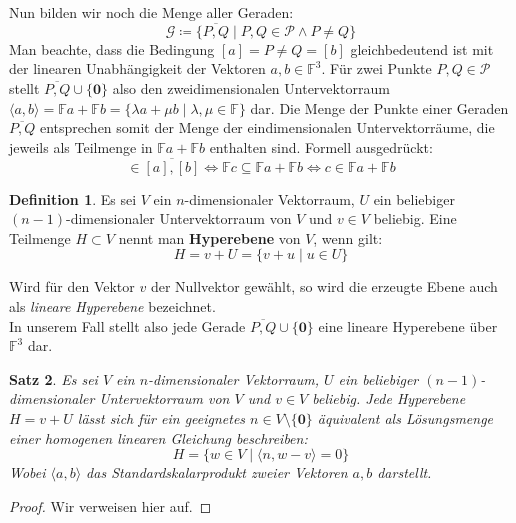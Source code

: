 \documentclass[hidelinks]{article}
\theoremstyle{plain}
\newtheorem{thm}{Satz}[section]
\theoremstyle{definition}
\newtheorem{defn}[thm]{Definition}
\theoremstyle{rem}
\begin{document}
\begin{sloppypar}
Nun bilden wir noch die Menge aller Geraden:
\begin{equation*}
	\mathcal{G}\coloneqq\{\overline{P,Q}\mid P,Q\in\mathcal{P}\land P\ne Q\}
\end{equation*}
Man beachte, dass die Bedingung $[a]=P\ne Q=[b]$ gleichbedeutend ist mit der linearen Unabhängigkeit der Vektoren $a,b\in\mathbb{F}^3$. Für zwei Punkte $P,Q\in\mathcal{P}$ stellt $\overline{P,Q}\cup\{\boldsymbol 0\}$ also den zweidimensionalen Untervektorraum $\langle a,b\rangle=\mathbb{F}a+\mathbb{F}b=\{\lambda a+\mu b\mid \lambda,\mu\in\mathbb{F}\}$ dar. 
Die Menge der Punkte einer Geraden $\overline{P,Q}$ entsprechen somit der Menge der eindimensionalen Untervektorräume, die jeweils als Teilmenge in $\mathbb{F}a+\mathbb{F}b$ enthalten sind. Formell ausgedrückt:
\begin{equation*}
	[c]\in\overline{[a],[b]}\Leftrightarrow \mathbb{F}c\subseteq\mathbb{F}a+\mathbb{F}b\Leftrightarrow c\in\mathbb{F}a+\mathbb{F}b
\end{equation*}
\begin{defn}
	Es sei $V$ ein $n$-dimensionaler Vektorraum, $U$ ein beliebiger \mbox{$(n-1)$-dimensionaler} Untervektorraum von $V$ und $v\in V$ beliebig. Eine Teilmenge $H\subset V$ nennt man \textbf{Hyperebene} von $V$, wenn gilt:
\begin{equation*}
	H=v+U=\{v+u\mid u\in U\} 
\end{equation*}
\end{defn}
Wird für den Vektor $v$ der Nullvektor gewählt, so wird die erzeugte Ebene auch als \textit{lineare Hyperebene} bezeichnet.\\
In unserem Fall stellt also jede Gerade $\overline{P,Q}\cup\{\boldsymbol 0\}$ eine lineare Hyperebene über $\mathbb{F}^3$ dar.
\begin{thm}\label{hyperebene}
Es sei $V$ ein $n$-dimensionaler Vektorraum, $U$ ein beliebiger $(n-1)$-dimensionaler Untervektorraum von $V$ und $v\in V$ beliebig. 
Jede Hyperebene $H=v+U$ lässt sich für ein geeignetes $n\in V\setminus\{\boldsymbol 0\}$ äquivalent als Lösungsmenge einer homogenen linearen Gleichung beschreiben:
\begin{equation*}
	H=\{w\in V\mid \langle n,w-v\rangle=0\}
\end{equation*}
Wobei $\langle a,b\rangle$ das Standardskalarprodukt zweier Vektoren $a,b$ darstellt.
\end{thm}
\begin{proof}
	Wir verweisen hier auf\cite[Seite~189]{linalg}.
\end{proof}

\end{sloppypar}
\end{document}

